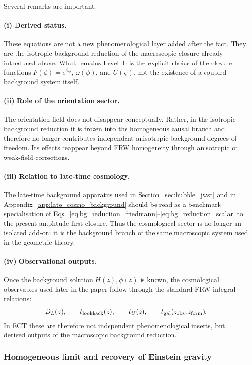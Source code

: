 \documentclass[11pt,a4paper]{article}
\numberwithin{equation}{section}
\begin{document}
Several remarks are important.

\paragraph{(i) Derived status.}
These equations are not a new phenomenological layer added after the
fact. They are the isotropic background reduction of the macroscopic
closure already introduced above.
What remains Level~B is the explicit choice of the closure functions
$F(\phi)=e^{\beta\phi}$, $\omega(\phi)$, and $U(\phi)$, not the existence of a
coupled background system itself.

\paragraph{(ii) Role of the orientation sector.}
The orientation field does not disappear conceptually.
Rather, in the isotropic background reduction it is frozen into the
homogeneous causal branch and therefore no longer contributes independent
anisotropic background degrees of freedom.
Its effects reappear beyond FRW homogeneity through anisotropic or
weak-field corrections.

\paragraph{(iii) Relation to late-time cosmology.}
The late-time background apparatus used in
Section~\ref{sec:hubble_jwst} and in
Appendix~\ref{app:late_cosmo_background}
should be read as a benchmark specialisation of
Eqs.~\eqref{eq:bg_reduction_friedmann}--\eqref{eq:bg_reduction_scalar}
to the present amplitude-first closure.
Thus the cosmological sector is no longer an isolated add-on: it is the
background branch of the same macroscopic system used in the geometric
theory.

\paragraph{(iv) Observational outputs.}
Once the background solution $H(z),\phi(z)$ is known, the cosmological
observables used later in the paper follow through the standard FRW
integral relations:
\[
D_L(z),\qquad
t_{\rm lookback}(z),\qquad
t_U(z),\qquad
t_{\rm gal}(z_{\rm obs};z_{\rm form}).
\]
In ECT these are therefore not independent phenomenological inserts, but
derived outputs of the macroscopic background reduction.

\subsubsection*{Homogeneous limit and recovery of Einstein gravity}
\end{document}
